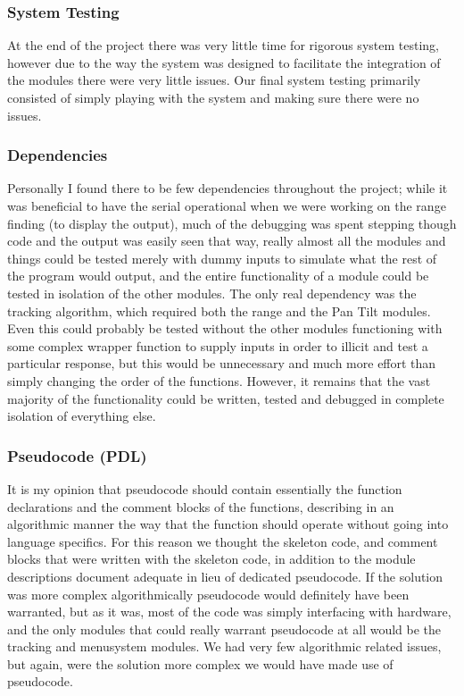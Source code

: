 \documentclass[]{report}
\begin{document}
\subsubsection{System Testing}
At the end of the project there was very little time for rigorous system testing, however due to the way the system was designed to facilitate the integration of the modules there were very little issues. Our final system testing primarily consisted of simply playing with the system and making sure there were no issues.

\subsubsection{Dependencies}
Personally I found there to be few dependencies throughout the project; while it was beneficial to have the serial operational when we were working on the range finding (to display the output), much of the debugging was spent stepping though code and the output was easily seen that way, really almost all the modules and things could be tested merely with dummy inputs to simulate what the rest of the program would output, and the entire functionality of a module could be tested in isolation of the other modules. The only real dependency was the tracking algorithm, which required both the range and the Pan Tilt modules. Even this could probably be tested without the other modules functioning with some complex wrapper function to supply inputs in order to illicit and test a particular response, but this would be unnecessary and much more effort than simply changing the order of the functions. However, it remains that the vast majority of the functionality could be written, tested and debugged in complete isolation of everything else.

\subsubsection{Pseudocode (PDL)}
It is my opinion that pseudocode should contain essentially the function declarations and the comment blocks of the functions, describing in an algorithmic manner the way that the function should operate without going into language specifics. For this reason we thought the skeleton code, and comment blocks that were written with the skeleton code, in addition to the module descriptions document adequate in lieu of dedicated pseudocode. If the solution was more complex algorithmically pseudocode would definitely have been warranted, but as it was, most of the code was simply interfacing with hardware, and the only modules that could really warrant pseudocode at all would be the tracking and menusystem modules. We had very few algorithmic related issues, but again, were the solution more complex we would have made use of pseudocode.
\end{document}
